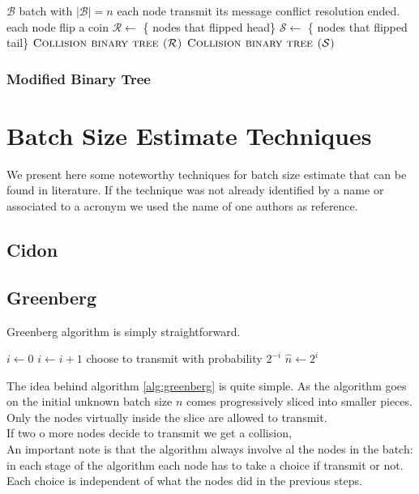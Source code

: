 \documentclass[12pt,a4paper]{report}
\newcommand{\algname}[1]{\ensuremath{\mbox{\sc #1}}}
\begin{document}
\begin{algorithm}[h!]
\caption{\algname{Collision binary tree ($\mathcal{B}$)}}
\label{alg:binarytree}
\begin{algorithmic}
\STATE {}
\REQUIRE $\mathcal{B}$ batch with $|\mathcal{B}|=n$
\STATE each node transmit its message
	\STATE conflict resolution ended.
\ELSE
	\STATE each node flip a coin
	\STATE $\mathcal{R} \gets$ \{ nodes that flipped head\}
	\STATE $\mathcal{S} \gets$ \{ nodes that flipped tail\}
	\STATE \algname{Collision binary tree ($\mathcal{R}$)}
	\STATE \algname{Collision binary tree ($\mathcal{S}$)}
\ENDIF
\end{algorithmic}
\end{algorithm}


\subsection{Modified Binary Tree}

\chapter{Batch Size Estimate Techniques}
We present here some noteworthy techniques for batch size estimate that can be found in literature.
If the technique was not already identified by a name or associated to a acronym we used the name of one authors as reference.
\section{Cidon}
\section{Greenberg}

Greenberg algorithm is simply straightforward.
\begin{algorithm}[h!]
\caption{\algname{Greenberg}}
\label{alg:greenberg}
\begin{algorithmic}
\STATE $i\gets 0$
\REPEAT
	\STATE $i\gets i+1$ 
	\STATE choose to transmit with probability $2^{-i}$
\STATE $\hat{n} \gets 2^{i}$
\end{algorithmic}
\end{algorithm}

The idea behind algorithm \ref{alg:greenberg} is quite simple. As the algorithm goes on the initial unknown batch size $n$
comes progressively sliced into smaller pieces. Only the nodes virtually inside the slice are allowed to transmit.\\
If two o more nodes decide to transmit we get a collision,\\
An important note is that the algorithm always involve al the nodes in the batch: in each stage of the algorithm each node has to take a choice if transmit or not. 
Each choice is independent of what the nodes did in the previous steps. 
\end{document}
